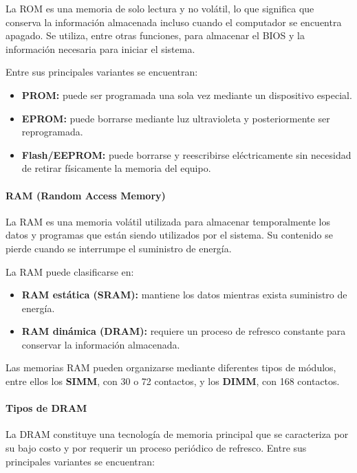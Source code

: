 \documentclass[10pt]{article}
\begin{document}
La ROM es una memoria de solo lectura y no volátil, lo que significa que conserva la información almacenada incluso cuando el computador se encuentra apagado. Se utiliza, entre otras funciones, para almacenar el BIOS y la información necesaria para iniciar el sistema.

Entre sus principales variantes se encuentran:

\begin{itemize}
\item \textbf{PROM:} puede ser programada una sola vez mediante un dispositivo especial.
\item \textbf{EPROM:} puede borrarse mediante luz ultravioleta y posteriormente ser reprogramada.
\item \textbf{Flash/EEPROM:} puede borrarse y reescribirse eléctricamente sin necesidad de retirar físicamente la memoria del equipo.
\end{itemize}

\paragraph{RAM (Random Access Memory)}

La RAM es una memoria volátil utilizada para almacenar temporalmente los datos y programas que están siendo utilizados por el sistema. Su contenido se pierde cuando se interrumpe el suministro de energía.

La RAM puede clasificarse en:

\begin{itemize}
\item \textbf{RAM estática (SRAM):} mantiene los datos mientras exista suministro de energía.
\item \textbf{RAM dinámica (DRAM):} requiere un proceso de refresco constante para conservar la información almacenada.
\end{itemize}

Las memorias RAM pueden organizarse mediante diferentes tipos de módulos, entre ellos los \textbf{SIMM}, con 30 o 72 contactos, y los \textbf{DIMM}, con 168 contactos.

\paragraph{Tipos de DRAM}

La DRAM constituye una tecnología de memoria principal que se caracteriza por su bajo costo y por requerir un proceso periódico de refresco. Entre sus principales variantes se encuentran:
\end{document}
